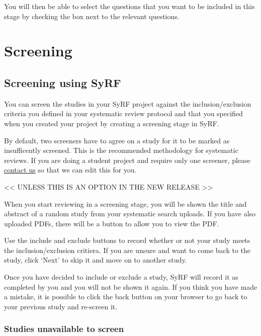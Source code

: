 \documentclass[
]{book}
\begin{document}
You will then be able to select the questions that you want to be included in this stage by checking the box next to the relevant questions.

\hypertarget{screening}{%
\chapter{Screening}\label{screening}}

\hypertarget{screening-using-syrf}{%
\section{Screening using SyRF}\label{screening-using-syrf}}

You can screen the studies in your SyRF project against the inclusion/exclusion criteria you defined in your systematic review protocol and that you specified when you created your project by creating a screening stage in SyRF.

By default, two screeners have to agree on a study for it to be marked as insufficently screened. This is the recommended methodology for systematic reviews. If you are doing a student project and require only one screener, please \href{syrf.info@ed.ac.uk}{contact us} so that we can edit this for you.

\textless{}\textless{} UNLESS THIS IS AN OPTION IN THE NEW RELEASE \textgreater{}\textgreater{}

When you start reviewing in a screening stage, you will be shown the title and abstract of a random study from your systematic search uploads. If you have also uploaded PDFs, there will be a button to allow you to view the PDF.

Use the include and exclude buttons to record whether or not your study meets the inclusion/exclusion critiera. If you are unsure and want to come back to the study, click `Next' to skip it and move on to another study.

Once you have decided to include or exclude a study, SyRF will record it as completed by you and you will not be shown it again. If you think you have made a mistake, it is possible to click the back button on your browser to go back to your previous study and re-screen it.

\hypertarget{studies-unavailable-to-screen}{%
\subsection{Studies unavailable to screen}\label{studies-unavailable-to-screen}}
\end{document}
